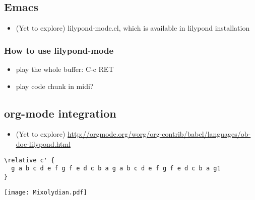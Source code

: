 \documentclass[11pt]{article}
\begin{document}
\subsection{Emacs}
\label{sec:orgada08ec}

\begin{itemize}
\item (Yet to explore) lilypond-mode.el, which is available in lilypond installation
\end{itemize}

\subsubsection{How to use lilypond-mode}
\label{sec:org0184734}

\begin{itemize}
\item play the whole buffer: C-c RET

\item play code chunk in midi?
\end{itemize}

\subsection{org-mode integration}
\label{sec:org95056d1}

\begin{itemize}
\item (Yet to explore) \url{http://orgmode.org/worg/org-contrib/babel/languages/ob-doc-lilypond.html}
\end{itemize}

\begin{verbatim}
\relative c' { 
  g a b c d e f g f e d c b a g a b c d e f g f e d c b a g1 
}
\end{verbatim}

\begin{center}
\texttt{[image: Mixolydian.pdf]}
\end{center}
\end{document}

